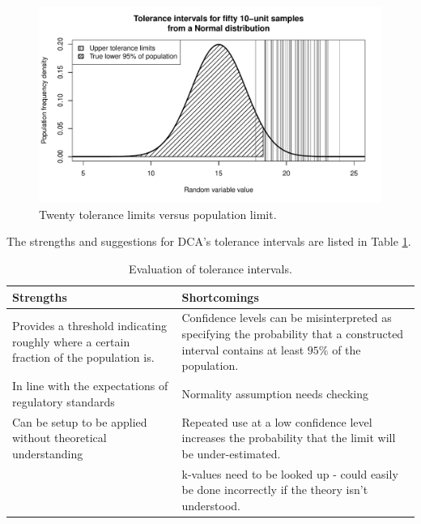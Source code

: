 \documentclass[11pt,a4paper,article]{memoir} %
\begin{document}
\begin{figure}[H]
\includegraphics[width=\textwidth]{tolerance_intervals.pdf}
\caption{Twenty tolerance limits versus population limit.}
\label{fig:tolerance_intervals}
\end{figure}
The strengths and suggestions for DCA's tolerance intervals are listed in Table \ref{tab:tol_intervals}.
\begin{table}[b]
\caption{Evaluation of tolerance intervals.}
\small
\hspace*{-.5cm}
\begin{tabular}{p{6.5cm}p{6.5cm}}
\toprule
\textbf{Strengths}	&	\textbf{Shortcomings} \\
\toprule
Provides a threshold indicating roughly where a certain fraction of the population is. & Confidence levels can be misinterpreted as specifying the probability that a constructed interval contains at least $95\%$ of the population. \\
In line with the expectations of regulatory standards & Normality assumption needs checking \\
Can be setup to be applied without theoretical understanding & Repeated use at a low confidence level increases the probability that the limit will be under-estimated. \\
& k-values need to be looked up - could easily be done incorrectly if the theory isn't understood.\\
\bottomrule
\end{tabular}
\label{tab:tol_intervals}
\end{table}

\newpage
\end{document}
